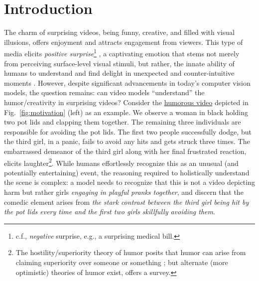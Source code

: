 \section{Introduction}
The charm of surprising videos, being funny, creative, and filled with visual illusions, %
offers enjoyment and attracts engagement from viewers.
This type of media elicits \emph{positive surprise}\footnote{c.f., \emph{negative} surprise, e.g., a surprising medical bill.} \cite{noordewier2013valence},
a captivating emotion that stems not merely from perceiving surface-level visual stimuli, but rather, the innate ability of humans to understand and find delight in unexpected and counter-intuitive moments \cite{martin1983humour}. However, despite significant advancements in today's computer vision models, the question remains: can video models ``understand'' the humor/creativity in surprising videos? %
Consider the \href{https://www.facebook.com/kiosgim/videos/3766868883332108}{humorous video} depicted in Fig.~\ref{fig:motivation} (left) as an example. We observe a woman in black holding two pot lids and clapping them together. The remaining three individuals are responsible for avoiding the pot lids. The first two people successfully dodge, but the third girl, in a panic, fails to avoid any hits and gets struck three times. The embarrassed demeanor of the third girl along with her final frustrated reaction, elicits laughter\footnote{The hostility/superiority theory of humor posits that
humor can arise from claiming superiority over someone or something \cite{gruner1978understanding,billig2005laughter}; but alternate (more optimistic) theories of humor exist, \cite{attardo2008primer} offers a survey.}. While humans effortlessly recognize this as an unusual (and potentially entertaining) event, %
the reasoning required to holistically understand the scene is complex:
a model needs to %
recognize that this is not a video depicting harm but rather girls \textit{engaging in playful pranks together}, and discern that the comedic element arises from \textit{the stark contrast between the third girl being hit by the pot lids every time and the first two girls skillfully avoiding them}.

